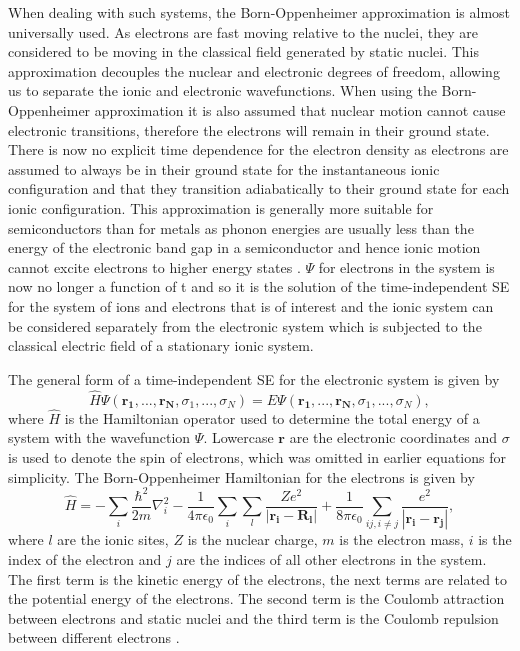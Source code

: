 \documentclass[11pt, twoside]{report}
\begin{document}
When dealing with such systems, the Born-Oppenheimer approximation is almost universally used. As electrons are fast moving relative to the nuclei, they are considered to be moving in the classical field generated by static nuclei. This approximation decouples the nuclear and electronic degrees of freedom, allowing us to separate the ionic and electronic wavefunctions. 
When using the Born-Oppenheimer approximation it is also assumed that nuclear motion cannot cause electronic transitions, therefore the electrons will remain in their ground state. There is now no explicit time dependence for the electron density as electrons are assumed to always be in their ground state for the instantaneous ionic configuration and that they transition adiabatically to their ground state for each ionic configuration. This approximation is generally more suitable for semiconductors than for metals as phonon energies are usually less than the energy of the electronic band gap in a semiconductor and hence ionic motion cannot excite electrons to higher energy states \cite{Prasad_ch2}. $\Psi$ for electrons in the system is now no longer a function of t and so it is the solution of the time-independent SE for the system of ions and electrons that is of interest and the ionic system can be considered separately from the electronic system which is subjected to the classical electric field of a stationary ionic system.

The general form of a time-independent SE for the electronic system is given by 
\begin{equation}\label{TISE}
\hat{H}\Psi(\mathbf{r_1}, ..., \mathbf{r_N}, \sigma_1, ..., \sigma_N) = E\Psi(\mathbf{r_1}, ..., \mathbf{r_N}, \sigma_1, ..., \sigma_N),
\end{equation}
where $\hat{H}$ is the Hamiltonian operator used to determine the total energy of a system with the wavefunction $\Psi$. Lowercase $\boldsymbol{r}$ are the electronic coordinates and $\sigma$ is used to denote the spin of electrons, which was omitted in earlier equations for simplicity. The Born-Oppenheimer Hamiltonian for the electrons is given by
\begin{equation}\label{Born-Opp}
\hat{H} = - \sum_i \frac{\hbar^2}{2m}\nabla_i^2 - \frac{1}{4 \pi \epsilon_0}\sum_i \sum_l \frac{Ze^2}{|\mathbf{r_i}-\mathbf{R_l}|} + \frac{1}{8 \pi \epsilon_0} \sum_{ij, i \neq j}\frac{e^2}{|\mathbf{r_i}-\mathbf{r_j}|},
\end{equation}
where $l$ are the ionic sites, $Z$ is the nuclear charge, $m$ is the electron mass, $i$ is the index of the electron and $j$ are the indices of all other electrons in the system. The first term is the kinetic energy of the electrons, the next terms are related to the potential energy of the electrons. The second term is the Coulomb attraction between electrons and static nuclei and the third term is the Coulomb repulsion between different electrons \cite{Prasad_ch2}.
\end{document}
